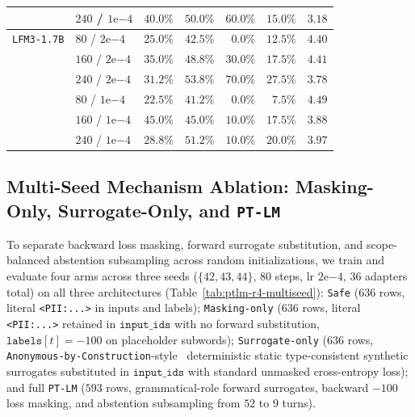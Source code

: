 \documentclass{article}
\begin{document}
\begin{table}[t]
\begin{center}
\begin{tabular}{llrrrrr}
 & $240$ / $1\mathrm{e}{-4}$ & $40.0\%$ & $50.0\%$ & $60.0\%$ & $15.0\%$ & $3.18$ \\
\midrule
\texttt{LFM3-1.7B} & $80$ / $2\mathrm{e}{-4}$ & $25.0\%$ & $42.5\%$ & $0.0\%$ & $12.5\%$ & $4.40$ \\
 & $160$ / $2\mathrm{e}{-4}$ & $35.0\%$ & $48.8\%$ & $30.0\%$ & $17.5\%$ & $4.41$ \\
 & $240$ / $2\mathrm{e}{-4}$ & $31.2\%$ & $53.8\%$ & $70.0\%$ & $27.5\%$ & $3.78$ \\
 & $80$ / $1\mathrm{e}{-4}$ & $22.5\%$ & $41.2\%$ & $0.0\%$ & $7.5\%$ & $4.49$ \\
 & $160$ / $1\mathrm{e}{-4}$ & $45.0\%$ & $45.0\%$ & $10.0\%$ & $17.5\%$ & $3.88$ \\
 & $240$ / $1\mathrm{e}{-4}$ & $28.8\%$ & $51.2\%$ & $10.0\%$ & $20.0\%$ & $3.97$ \\
\bottomrule
\end{tabular}
\end{center}
\vskip -0.14in
\end{table}

\subsection{Multi-Seed Mechanism Ablation: Masking-Only, Surrogate-Only, and \texttt{PT-LM}}
\label{sec:ptlm-r4}

To separate backward loss masking, forward surrogate substitution, and scope-balanced abstention subsampling across random initializations, we train and evaluate four arms across three seeds ($\{42, 43, 44\}$, $80$ steps, lr $2\mathrm{e}{-4}$, $36$ adapters total) on all three architectures (Table~\ref{tab:ptlm-r4-multiseed}): \texttt{Safe} ($636$ rows, literal \texttt{<PII:...>} in inputs and labels); \texttt{Masking-only} ($636$ rows, literal \texttt{<PII:...>} retained in $\texttt{input\_ids}$ with no forward substitution, $\texttt{labels}[t] = -100$ on placeholder subwords); \texttt{Surrogate-only} ($636$ rows, \texttt{Anonymous-by-Construction}-style~\citep{albanese2026anonymous} deterministic static type-consistent synthetic surrogates substituted in $\texttt{input\_ids}$ with standard unmasked cross-entropy loss); and full \texttt{PT-LM} ($593$ rows, grammatical-role forward surrogates, backward $-100$ loss masking, and abstention subsampling from $52$ to $9$ turns).
\end{document}
